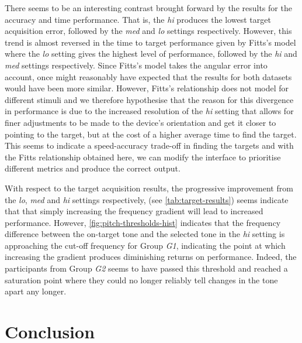 \documentclass{article}
\begin{document}
There seems to be an interesting contrast brought forward by the results for the accuracy and time performance.
That is, the \textit{hi} produces the lowest target acquisition error, followed by the \textit{med} and \textit{lo} settings respectively. 
However, this trend is almost reversed in the time to target performance given by Fitts's model where the \textit{lo} setting gives the highest level of performance, followed by the \textit{hi} and \textit{med} settings respectively. 
Since Fitts's model takes the angular error into account, once might reasonably have expected that the results for both datasets would have been more similar. 
However, Fitts's relationship does not model for different stimuli and we therefore hypothesise that the reason for this divergence in performance is due to the increased resolution of the \textit{hi} setting that allows for finer adjustments to be made to the device's orientation and get it closer to pointing to the target, but at the cost of a higher average time to find the target. 
This seems to indicate a speed-accuracy trade-off in finding the targets and with the Fitts relationship obtained here, we can modify the interface to prioritise different metrics and produce the correct output.

With respect to the target acquisition results, the progressive improvement from the \textit{lo}, \textit{med} and \textit{hi} settings respectively, (see \cref{tab:target-results}) seems indicate that that simply increasing the frequency gradient will lead to increased performance.
However, \cref{fig:pitch-thresholds-hist} indicates that the frequency difference between the on-target tone and the selected tone in the \textit{hi} setting is approaching the cut-off frequency for Group \textit{G1}, indicating the point at which increasing the gradient produces diminishing returns on performance. 
Indeed, the participants from Group \textit{G2} seems to have passed this threshold and reached a saturation point where they could no longer reliably tell changes in the tone apart any longer. 

\section{Conclusion}\label{sec:conclusion}
\end{document}
